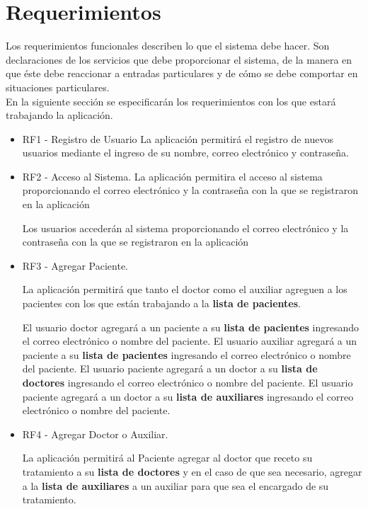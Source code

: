 \section{Requerimientos}
Los requerimientos funcionales describen lo que el sistema debe hacer. Son declaraciones de los servicios que debe proporcionar el sistema, de la manera en que éste debe reaccionar a entradas particulares y de cómo se debe comportar en situaciones particulares.\\
En la siguiente sección se especificarán los requerimientos con los que estará trabajando la aplicación.\\
\begin{itemize}
		\item RF1 - Registro de Usuario
		La aplicación permitirá el registro de nuevos usuarios mediante el ingreso de su nombre, correo electrónico y contraseña.
		
		\item RF2 - Acceso al Sistema.
		La aplicación permitira el acceso al sistema proporcionando el correo electrónico y la contraseña con la que se registraron en la aplicación
		
		Los usuarios accederán al sistema proporcionando el correo electrónico y la contraseña con la que se registraron en la aplicación
		
		\item RF3 - Agregar Paciente.
		 
		 La aplicación permitirá que tanto el doctor como el auxiliar agreguen a los pacientes con los que están trabajando a la \textbf{lista de pacientes}.
		 
		El usuario doctor agregará a un paciente a su \textbf{lista de pacientes} ingresando el correo electrónico o nombre del paciente.
		El usuario auxiliar agregará a un paciente a su \textbf{lista de pacientes} ingresando el correo electrónico o nombre del paciente.
		El usuario paciente agregará a un doctor a su \textbf{lista de doctores} ingresando el correo electrónico o nombre del paciente.
		El usuario paciente agregará a un doctor a su \textbf{lista de auxiliares} ingresando el correo electrónico o nombre del paciente.
	
		\item RF4 - Agregar Doctor o Auxiliar.
		
		La aplicación permitirá al Paciente agregar al doctor que receto su tratamiento a su \textbf{lista de doctores} y en el caso de que sea necesario, agregar a la \textbf{lista de auxiliares} a un auxiliar para que sea el encargado de su tratamiento.
		

\end{itemize}

